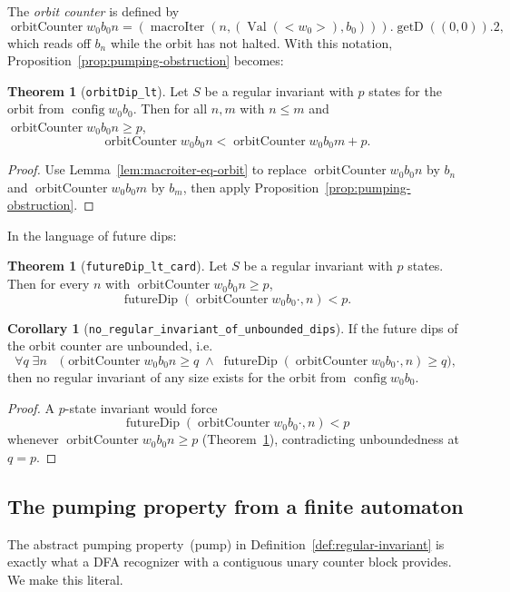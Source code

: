 \documentclass[11pt,a4paper]{article}
\theoremstyle{definition}
\newtheorem{theorem}[definition]{Theorem}
\newtheorem{corollary}[definition]{Corollary}
\newcommand{\lt}{<}
\newcommand{\gt}{>}
\newcommand{\val}{\operatorname{Val}}
\newcommand{\config}{\operatorname{config}}
\newcommand{\macroIter}{\operatorname{macroIter}}
\newcommand{\futureDip}{\operatorname{futureDip}}
\newcommand{\orbitCounter}{\operatorname{orbitCounter}}
\newcommand{\getD}{\operatorname{getD}}
\begin{document}
The \emph{orbit counter} is defined by
\[
  \orbitCounter{w_0}{b_0}{n}=(\macroIter(n,(\val(\lt w_0\gt),b_0))).\getD((0,0)).2,
\]
which reads off $b_n$ while the orbit has not halted.  With this notation,
Proposition~\ref{prop:pumping-obstruction} becomes:

\begin{theorem}[\texttt{orbitDip\_lt}]
\label{thm:orbit-dip}
Let $S$ be a regular invariant with $p$ states for the orbit from
$\config{w_0}{b_0}$.  Then for all $n,m$ with $n\le m$ and
$\orbitCounter{w_0}{b_0}{n}\ge p$,
\[
  \orbitCounter{w_0}{b_0}{n}
  <
  \orbitCounter{w_0}{b_0}{m}+p.
\]
\end{theorem}
\begin{proof}
Use Lemma~\ref{lem:macroiter-eq-orbit} to replace
$\orbitCounter{w_0}{b_0}{n}$ by $b_n$ and
$\orbitCounter{w_0}{b_0}{m}$ by $b_m$, then apply
Proposition~\ref{prop:pumping-obstruction}.
\end{proof}

In the language of future dips:

\begin{theorem}[\texttt{futureDip\_lt\_card}]
\label{thm:future-dip-lt}
Let $S$ be a regular invariant with $p$ states.  Then for every $n$ with
$\orbitCounter{w_0}{b_0}{n}\ge p$,
\[
  \futureDip(\orbitCounter{w_0}{b_0}{\cdot},n)<p.
\]
\end{theorem}

\begin{corollary}[\texttt{no\_regular\_invariant\_of\_unbounded\_dips}]
\label{cor:no-regular-invariant}
If the future dips of the orbit counter are unbounded, i.e.
\[
  \forall q\;\exists n\quad
  \bigl(\orbitCounter{w_0}{b_0}{n}\ge q\;\wedge\;
  \futureDip(\orbitCounter{w_0}{b_0}{\cdot},n)\ge q\bigr),
\]
then no regular invariant of any size exists for the orbit from
$\config{w_0}{b_0}$.
\end{corollary}
\begin{proof}
A $p$-state invariant would force
\[
  \futureDip(\orbitCounter{w_0}{b_0}{\cdot},n)<p
\]
whenever $\orbitCounter{w_0}{b_0}{n}\ge p$
(Theorem~\ref{thm:future-dip-lt}),
contradicting unboundedness at $q=p$.
\end{proof}

\subsection{The pumping property from a finite automaton}

The abstract pumping property~(pump) in
Definition~\ref{def:regular-invariant} is exactly what a DFA recognizer
with a contiguous unary counter block provides.  We make this literal.
\end{document}
